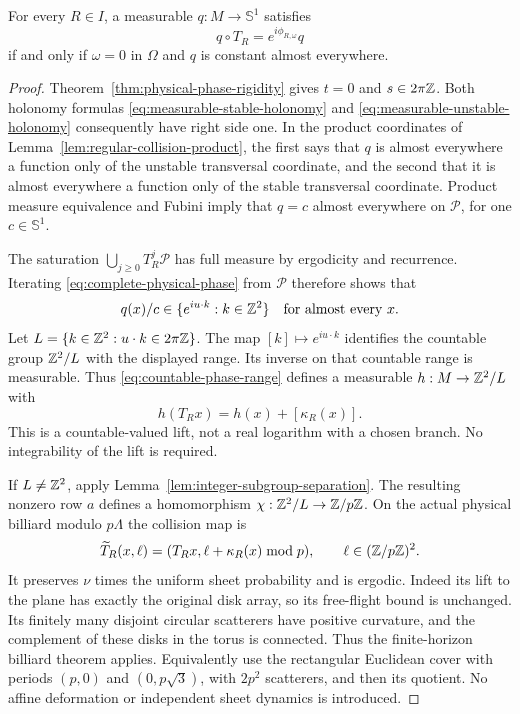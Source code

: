 \begin{theorem}
\label{thm:complete-physical-phase}
For every $R\in I$, a measurable $q:M\to\mathbb S^1$ satisfies
\begin{equation}\label{eq:complete-physical-phase}
 q\circ T_R=e^{i\phi_{R,\omega}}q
\end{equation}
if and only if $\omega=0$ in $\Omega$ and $q$ is constant almost
everywhere.
\end{theorem}
\begin{proof}
Theorem~\ref{thm:physical-phase-rigidity} gives $t=0$ and
$s\in2\pi\mathbb Z$. Both holonomy formulas
\eqref{eq:measurable-stable-holonomy} and
\eqref{eq:measurable-unstable-holonomy} consequently have right side
one. In the product coordinates of
Lemma~\ref{lem:regular-collision-product}, the first says that $q$
is almost everywhere a function only of the unstable transversal
coordinate, and the second that it is almost everywhere a function
only of the stable transversal coordinate. Product measure equivalence
and Fubini imply that $q=c$ almost everywhere on $\mathcal P$, for
one $c\in\mathbb S^1$.

The saturation $\bigcup_{j\ge0}T_R^j\mathcal P$ has full measure by
ergodicity and recurrence. Iterating \eqref{eq:complete-physical-phase}
from $\mathcal P$ therefore shows that
\begin{equation}\label{eq:countable-phase-range}
 q(x)/c\in\{e^{iu\cdot k}:k\in\Z^2\}
       \quad\hbox{for almost every }x.
\end{equation}
Let $L=\{k\in\mathbb Z^2:u\cdot k\in2\pi\mathbb Z\}$. The map
$[k]\mapsto e^{iu\cdot k}$ identifies the countable group $\mathbb Z^2/L$
with the displayed range. Its inverse on that countable range is
measurable. Thus \eqref{eq:countable-phase-range} defines a measurable
$h:M\to\mathbb Z^2/L$ with
\begin{equation}\label{eq:countable-phase-cocycle}
 h(T_Rx)=h(x)+[\kappa_R(x)].
\end{equation}
This is a countable-valued lift, not a real logarithm with a chosen
branch. No integrability of the lift is required.

If $L\ne\mathbb Z^2$, apply Lemma~\ref{lem:integer-subgroup-separation}.
The resulting nonzero row $a$ defines a homomorphism
$\chi:\mathbb Z^2/L\to\mathbb Z/p\mathbb Z$. On the actual physical billiard modulo
$p\Lambda$ the collision map is
\[
 \widetilde T_R(x,\ell)
 =(T_Rx,\ell+\kappa_R(x)\bmod p),\qquad
 \ell\in(\mathbb Z/p\mathbb Z)^2.
\]
It preserves $\nu$ times the uniform sheet probability and is ergodic.
Indeed its lift to the plane has exactly the original disk array, so
its free-flight bound is unchanged. Its finitely many disjoint circular
scatterers have positive curvature, and the complement of these disks
in the torus is connected. Thus the finite-horizon billiard theorem
\cite[Section 8.1]{Young} applies. Equivalently use the rectangular
Euclidean cover with periods $(p,0)$ and $(0,p\sqrt3)$, with $2p^2$
scatterers, and then its quotient. No affine deformation or independent
sheet dynamics is introduced.


\end{proof}
